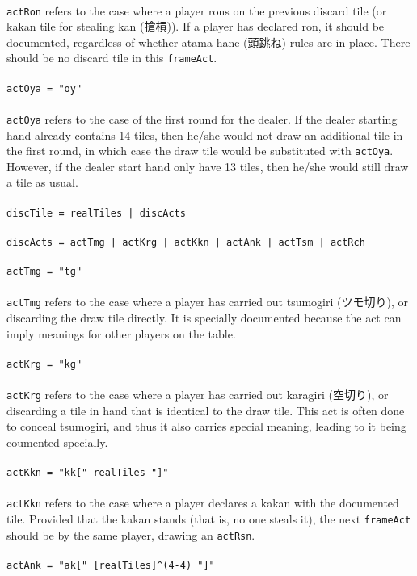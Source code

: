 \documentclass[%
	a4paper%
	,10pt%
	,twoside%
	,notitlepage%
]{article}%
\newcommand*{\ruleSymbol}{\textjapanese{⚠}}%
\newcommand*{\ruleMargin}{\marginpar{\flushright{}\ruleSymbol{}}}%
\newcommand*{\rulePar}{\paragraph*{\ruleMargin{}}}%
\begin{document}
			\paragraph*{}\lstinline/actRon/ refers to the case where a player rons on the previous discard tile (or kakan tile for stealing kan (\textjapanese{搶槓})). If a player has declared ron, it should be documented, regardless of whether atama hane (\textjapanese{頭跳ね}) rules are in place. There should be no discard tile in this \lstinline/frameAct/. %
			\rulePar{}\lstinline/actOya = "oy"/%
			\paragraph*{}\lstinline/actOya/ refers to the case of the first round for the dealer. If the dealer starting hand already contains 14 tiles, then he/she would not draw an additional tile in the first round, in which case the draw tile would be substituted with \lstinline/actOya/. However, if the dealer start hand only have 13 tiles, then he/she would still draw a tile as usual. %
			\rulePar{}\lstinline/discTile = realTiles | discActs/%
			\rulePar{}\lstinline/discActs = actTmg | actKrg | actKkn | actAnk | actTsm | actRch/%
			\rulePar{}\lstinline/actTmg = "tg"/%
			\paragraph*{}\lstinline/actTmg/ refers to the case where a player has carried out tsumogiri (\textjapanese{ツモ切り}), or discarding the draw tile directly. It is specially documented because the act can imply meanings for other players on the table. %
			\rulePar{}\lstinline/actKrg = "kg"/%
			\paragraph*{}\lstinline/actKrg/ refers to the case where a player has carried out karagiri (\textjapanese{空切り}), or discarding a tile in hand that is identical to the draw tile. This act is often done to conceal tsumogiri, and thus it also carries special meaning, leading to it being coumented specially. %
			\rulePar{}\lstinline/actKkn = "kk[" realTiles "]"/%
			\paragraph*{}\lstinline/actKkn/ refers to the case where a player declares a kakan with the documented tile. Provided that the kakan stands (that is, no one steals it), the next \lstinline/frameAct/ should be by the same player, drawing an \lstinline/actRsn/. %
			\rulePar{}\lstinline/actAnk = "ak[" [realTiles]^(4-4) "]"/%
\end{document}
